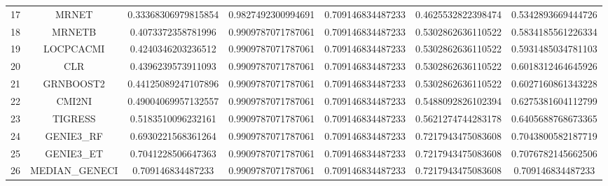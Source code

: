 \documentclass[a4paper,10pt]{article}
\begin{document}
\begin{landscape}
\begin{table}[!htp]
\begin{tabular}{ccccccc}
17&MRNET&0.33368306979815854&0.9827492300994691&0.709146834487233&0.4625532822398474&0.5342893669444726\\
18&MRNETB&0.4073372358781996&0.9909787071787061&0.709146834487233&0.5302862636110522&0.5834185561226334\\
19&LOCPCACMI&0.4240346203236512&0.9909787071787061&0.709146834487233&0.5302862636110522&0.5931485034781103\\
20&CLR&0.4396239573911093&0.9909787071787061&0.709146834487233&0.5302862636110522&0.6018312464645926\\
21&GRNBOOST2&0.44125089247107896&0.9909787071787061&0.709146834487233&0.5302862636110522&0.6027160861343228\\
22&CMI2NI&0.49004069957132557&0.9909787071787061&0.709146834487233&0.5488092826102394&0.6275381604112799\\
23&TIGRESS&0.5183510096232161&0.9909787071787061&0.709146834487233&0.5621274744283178&0.6405688768673365\\
24&GENIE3_RF&0.6930221568361264&0.9909787071787061&0.709146834487233&0.7217943475083608&0.7043800582187719\\
25&GENIE3_ET&0.7041228506647363&0.9909787071787061&0.709146834487233&0.7217943475083608&0.7076782145662506\\
26&MEDIAN_GENECI&0.709146834487233&0.9909787071787061&0.709146834487233&0.7217943475083608&0.709146834487233\\
\hline
\end{tabular}
\end{table}

\end{landscape}
\end{document}
